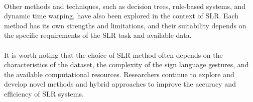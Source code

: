 \paragraph{}
Other methods and techniques, such as decision trees, rule-based systems, and dynamic time warping, have also been explored in the context of SLR. Each method has its own strengths and limitations, and their suitability depends on the specific requirements of the SLR task and available data.
\paragraph{}
It is worth noting that the choice of SLR method often depends on the characteristics of the dataset, the complexity of the sign language gestures, and the available computational resources. Researchers continue to explore and develop novel methods and hybrid approaches to improve the accuracy and efficiency of SLR systems.

